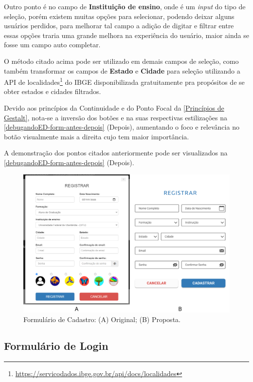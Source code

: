 Outro ponto é no campo de \textbf{Instituição de ensino}, onde é um \textit{input} do tipo de seleção, porém existem muitas opções para selecionar, podendo deixar alguns usuários perdidos, para melhorar tal campo a adição de digitar e filtrar entre essas opções traria uma grande melhora na experiência do usuário, maior ainda se fosse um campo auto completar.

O método citado acima pode ser utilizado em demais campos de seleção, como também transformar os campos de \textbf{Estado} e \textbf{Cidade} para seleção utilizando a \ac{API} de localidades\footnote{\url{https://servicodados.ibge.gov.br/api/docs/localidades}} do IBGE disponibilizada gratuitamente pra propósitos de se obter estados e cidades filtrados.

Devido aos princípios da Continuidade e do Ponto Focal da \autoref{Princípios de Gestalt}, nota-se a inversão dos botões e na suas respectivas estilizações na \autoref{debugandoED-form-antes-depois} (Depois), aumentando o foco e relevância no botão visualmente mais a direita cujo tem maior importância.

A demonstração dos pontos citados anteriormente pode ser visualizados na \autoref{debugandoED-form-antes-depois} (Depois).

\begin{figure}[htb]
    \begin{center}
	    \includegraphics[scale=0.35]{figs/debugandoED-form-antes-depois.png}
	\end{center}
    \caption{\label{debugandoED-form-antes-depois}Formulário de Cadastro: (A) Original; (B) Proposta.}
\end{figure}

\subsection{Formulário de Login}
\label{Formulário de Login}

